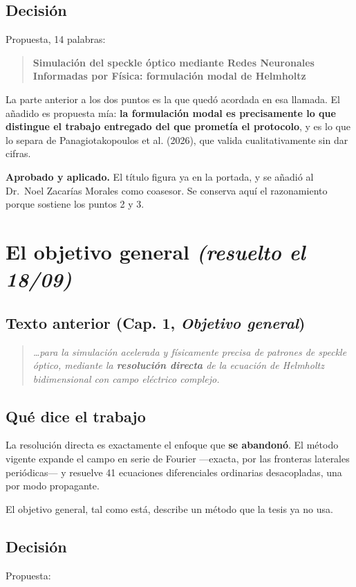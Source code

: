 \documentclass[11pt,a4paper]{article}
\renewcommand{\%}{\char`\%\relax}%
\newcommand{\cita}[1]{%
  \begin{quote}\itshape\color{gris}#1\end{quote}}
\begin{document}
\subsection{Decisión}
Propuesta, 14 palabras:

\begin{quote}
\bfseries
Simulación del speckle óptico mediante Redes Neuronales Informadas por Física:
formulación modal de Helmholtz
\end{quote}

\noindent
La parte anterior a los dos puntos es la que quedó acordada en esa llamada. El
añadido es propuesta mía: \textbf{la formulación modal es precisamente lo que
distingue el trabajo entregado del que prometía el protocolo}, y es lo que lo
separa de Panagiotakopoulos et al. (2026), que valida cualitativamente sin dar
cifras.

\vspace{0.3em}
\noindent
\textbf{Aprobado y aplicado.} El título figura ya en la portada, y se añadió al
Dr.~Noel Zacarías Morales como coasesor. Se conserva aquí el razonamiento
porque sostiene los puntos 2 y 3.

\section{El objetivo general \normalfont\textit{(resuelto el 18/09)}}

\subsection{Texto anterior (Cap. 1, \textit{Objetivo general})}
\cita{\ldots para la simulación acelerada y físicamente precisa de patrones de
speckle óptico, mediante la \textbf{resolución directa} de la ecuación de
Helmholtz bidimensional con campo eléctrico complejo.}

\subsection{Qué dice el trabajo}
La resolución directa es exactamente el enfoque que \textbf{se abandonó}. El
método vigente expande el campo en serie de Fourier ---exacta, por las fronteras
laterales periódicas--- y resuelve 41 ecuaciones diferenciales ordinarias
desacopladas, una por modo propagante.

El objetivo general, tal como está, describe un método que la tesis ya no usa.

\subsection{Decisión}
Propuesta:
\end{document}
